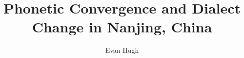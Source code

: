 \documentclass[defaultstyle,11pt]{thesis}
\title{Phonetic Convergence and Dialect Change in Nanjing, China}
\author{Evan Hugh}{Coles-Harris}
\begin{document}








\nocite{*}		%

\appendix


\end{document}
